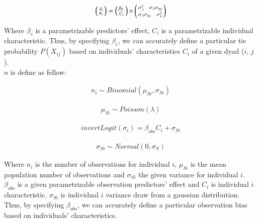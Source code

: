 \documentclass[Afour,sageh,times]{sagej}
\begin{document}
\begin{ceqn}
  \begin{align}\label{rho}
    \begin{psmallmatrix}
      \lambda_{i}\\
      \pi_{i}
    \end{psmallmatrix} = 
    \begin{psmallmatrix}
      \beta_{C}\\C_{i}
    \end{psmallmatrix} \circ 
    \begin{psmallmatrix}
      \sigma_{\lambda}^{2} \ \ \ \sigma_{\lambda}{\sigma_{\pi \rho }}\\
      \sigma_{\lambda}{\sigma_{\pi \rho }} \ \ \ \sigma_{\pi}^{2}
    \end{psmallmatrix}
  \end{align}
\end{ceqn}
Where $\beta_{c}$ is a parametrizable predictors' effect, $C_{i}$ is a parametrizable individual characteristic. Thus, by specifying $\beta_{c}$, we can accurately define a particular tie probability $P(X_{ij})$ based on individuals' characteristics $C_{i}$ of a given dyad ($i$, $j$).\\

$n$ is define as fellow: 

\begin{ceqn}
  \begin{align}\label{Bms}
    n_{i} \sim Binomial(\mu_{Si}, \sigma_{Si})
  \end{align}
\end{ceqn}

\begin{ceqn}
  \begin{align}\label{Pl}
    \mu_{Si} \sim Poisson(\lambda)
  \end{align}
\end{ceqn}
\begin{ceqn}
  \begin{align}\label{Sbc}
        invertLogit(\sigma_{i}) = \beta_{obs}C_{i} + \sigma_{Si}
  \end{align}
\end{ceqn}
\begin{ceqn}
  \begin{align}\label{Ns}
    \sigma_{Si} \sim Normal(0, \sigma_{S})
  \end{align}
\end{ceqn}

Where $n_{i}$ is the number of observations for individual $i$, $\mu_{Si}$ is the mean population number of observations and $\sigma_{Si}$ the given variance for individual $i$. $\beta_{obs}$ is a given parametrizable observation predictors' effect and $C_{i}$ is individual $i$ characteristic. $\sigma_{Si}$ is individual $i$ variance draw from a gaussian distribution. Thus, by specifying $\beta_{obs}$, we can accurately define a particular observation bias based on individuals' characteristics.
\end{document}
